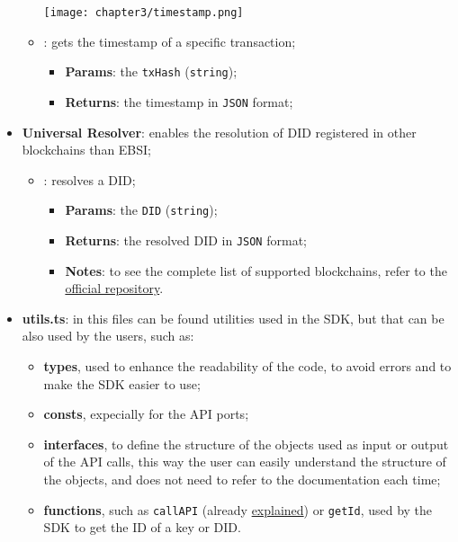 \begin{itemize}
\begin{itemize}
\begin{center}
            \texttt{[image: chapter3/timestamp.png]}
            \label{fig:timestamp}
        \end{center}
        \item[] : gets the timestamp of a specific transaction;
        \begin{itemize}
            \item \textbf{Params}: the \texttt{txHash} (\texttt{string});
            \item \textbf{Returns}: the timestamp in \texttt{JSON} format;
        \end{itemize}
    \end{itemize}

    \item \textbf{Universal Resolver}: enables the resolution of DID registered in
    other blockchains than EBSI;
    \begin{itemize}
        \item[] : resolves a DID;
        \begin{itemize}
            \item \textbf{Params}: the \texttt{DID} (\texttt{string});
            \item \textbf{Returns}: the resolved DID in \texttt{JSON} format;
            \item \textbf{Notes}: to see the complete list of supported blockchains,
            refer to the \href{https://github.com/decentralized-identity/universal-resolver}
            {official repository}.
        \end{itemize} 
    \end{itemize}

    \item \textbf{utils.ts}: in this files can be found utilities used in the SDK, but that
    can be also used by the users, such as:
    \begin{itemize}
        \item \textbf{types}, used to enhance the readability of the code, to avoid errors and to
        make the SDK easier to use;
        \item \textbf{consts}, expecially for the API ports;
        \item \textbf{interfaces}, to define the structure of the objects used as input or
        output of the API calls, this way the user can easily understand the structure of
        the objects, and does not need to refer to the documentation each time;
        \item \textbf{functions}, such as \texttt{callAPI} (already \hyperref[fig:callAPI]
        {explained}) or \texttt{getId}, used by the SDK to get the ID of a key or DID.
    \end{itemize}
    

\end{itemize}
